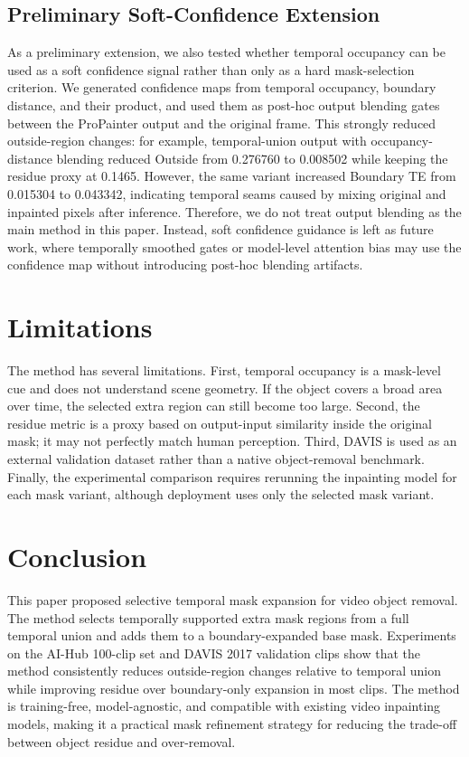 \documentclass[nouppercase]{kaia}
\begin{document}
\subsection{Preliminary Soft-Confidence Extension}
As a preliminary extension, we also tested whether temporal occupancy can be used as a soft confidence signal rather than only as a hard mask-selection criterion. We generated confidence maps from temporal occupancy, boundary distance, and their product, and used them as post-hoc output blending gates between the ProPainter output and the original frame. This strongly reduced outside-region changes: for example, temporal-union output with occupancy-distance blending reduced Outside from 0.276760 to 0.008502 while keeping the residue proxy at 0.1465. However, the same variant increased Boundary TE from 0.015304 to 0.043342, indicating temporal seams caused by mixing original and inpainted pixels after inference. Therefore, we do not treat output blending as the main method in this paper. Instead, soft confidence guidance is left as future work, where temporally smoothed gates or model-level attention bias may use the confidence map without introducing post-hoc blending artifacts.

\section{Limitations}
The method has several limitations. First, temporal occupancy is a mask-level cue and does not understand scene geometry. If the object covers a broad area over time, the selected extra region can still become too large. Second, the residue metric is a proxy based on output-input similarity inside the original mask; it may not perfectly match human perception. Third, DAVIS is used as an external validation dataset rather than a native object-removal benchmark. Finally, the experimental comparison requires rerunning the inpainting model for each mask variant, although deployment uses only the selected mask variant.

\section{Conclusion}
This paper proposed selective temporal mask expansion for video object removal. The method selects temporally supported extra mask regions from a full temporal union and adds them to a boundary-expanded base mask. Experiments on the AI-Hub 100-clip set and DAVIS 2017 validation clips show that the method consistently reduces outside-region changes relative to temporal union while improving residue over boundary-only expansion in most clips. The method is training-free, model-agnostic, and compatible with existing video inpainting models, making it a practical mask refinement strategy for reducing the trade-off between object residue and over-removal.
\end{document}
